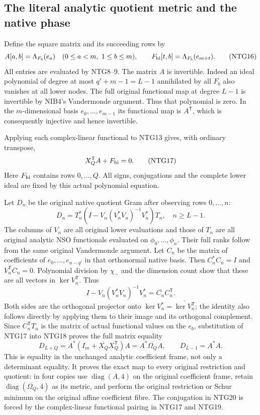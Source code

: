 \documentclass[11pt,a4paper]{article}
\begin{document}
\subsection{The literal analytic quotient metric and the native phase}
Define the square matrix and its succeeding rows by
\[
 A[a,b]=\Lambda_{F_b}(e_a)\quad(0\le a<m,\ 1\le b\le m),
 \qquad F_{\rm hi}[t,b]=\Lambda_{F_b}(e_{m+t}).
                                                               \tag{NTG16}
\]
All entries are evaluated by NTG8--9. The matrix $A$ is
invertible. Indeed an ideal polynomial of degree at most
$q'+m-1=L-1$ annihilated by all $F_b$ also vanishes at all
lower nodes. The full original functional map at degree
$L-1$ is invertible by NIB4's Vandermonde argument.
Thus that polynomial is zero. In the $m$-dimensional basis
$e_0,\ldots,e_{m-1}$ its functional map is $A^{\mathsf T}$,
which is consequently injective and hence invertible.

Applying each complex-linear functional to NTG13 gives,
with ordinary transpose,
\[
          X_Q^{\mathsf T}A+F_{\rm hi}=0 .
                                                               \tag{NTG17}
\]
Here $F_{\rm hi}$ contains rows $0,\ldots,Q$. All signs,
conjugations and the complete lower ideal are fixed by this
actual polynomial equation.

Let $D_n$ be the original native quotient Gram after observing
rows $0,\ldots,n$:
\[
 D_n=T_n^*(I-V_n(V_n^*V_n)^{-1}V_n^*)T_n,\quad n\ge L-1.
                                                               \tag{NTG18}
\]
The columns of $V_n$ are all original lower evaluations and
those of $T_n$ are all original analytic NSO functionals
evaluated on $\phi_0,\ldots,\phi_n$. Their full ranks follow
from the same original Vandermonde argument. Let $C_n$ be
the matrix of coefficients of $e_0,\ldots,e_{n-q'}$ in
that orthonormal native basis. Then $C_n^*C_n=I$ and
$V_n^{\mathsf T}C_n=0$. Polynomial division by $\chi_-$
and the dimension count show that these are all vectors
in $\ker V_n^{\mathsf T}$. Thus
\[
 I-V_n(V_n^*V_n)^{-1}V_n^*
       =\overline{C_n}C_n^{\mathsf T}.
                                                               \tag{NTG19}
\]
Both sides are the orthogonal projector onto
$\ker V_n^*=\overline{\ker V_n^{\mathsf T}}$; the identity
also follows directly by applying them to their image and
its orthogonal complement. Since $C_n^{\mathsf T}T_n$
is the matrix of actual functional values on the $e_b$,
substitution of NTG17 into NTG18 proves the full matrix equality
\[
 \boxed{\quad
 D_{L+Q}
   =A^*(I_m+\overline{X_Q}X_Q^{\mathsf T})A
   =A^*\overline{\Omega_Q}A,\qquad D_{L-1}=A^*A .
 \quad}                                                        \tag{NTG20}
\]
This is equality in the unchanged analytic coefficient frame,
not only a determinant equality. It proves the exact map to
every original restriction and quotient: in four copies use
$\operatorname{diag}(A,4)$ on the original coefficient frame,
retain $\operatorname{diag}(\overline{\Omega_Q},4)$ as its
metric, and perform the original restriction or Schur
minimum on the original affine coefficient fibre. The
conjugation in NTG20 is forced by the complex-linear
functional pairing in NTG17 and NTG19.
\end{document}
